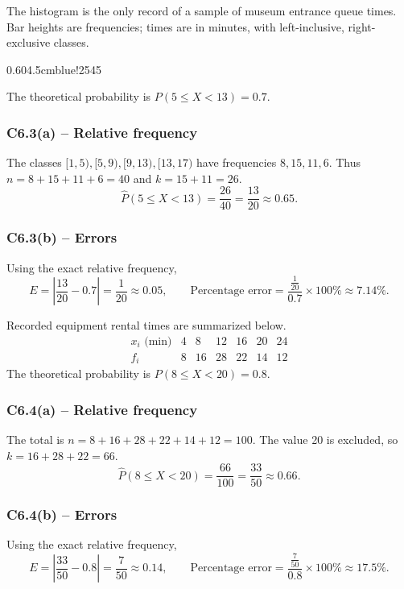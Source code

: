 {
The histogram is the only record of a sample of museum entrance queue times.
Bar heights are frequencies; times are in minutes, with left-inclusive,
right-exclusive classes.
\begin{center}
{0.60\textwidth}{4.5cm}{blue!25}{4}{5}
\end{center}
The theoretical probability is $P(5\le X<13)=0.7$.
\label{sol:c6-3a}
\subsubsection*{C6.3(a) -- Relative frequency }
The classes $[1,5),[5,9),[9,13),[13,17)$ have frequencies
$8,15,11,6$. Thus $n=8+15+11+6=40$ and $k=15+11=26$.
\[
\widehat P(5\le X<13)=\frac{26}{40}=\frac{13}{20}\approx0.65.
\]
\label{sol:c6-3b}
\subsubsection*{C6.3(b) -- Errors }
Using the exact relative frequency,
\[
E=\left|\frac{13}{20}-0.7\right|=\frac{1}{20}\approx0.05,\qquad
\text{Percentage error}=\frac{\frac{1}{20}}{0.7}\times100\%\approx7.14\%.
\]
\secInicio[sec:c6-3]

}

{
Recorded equipment rental times are summarized below.
\[
\begin{array}{c|rrrrrr}
x_i\text{ (min)}&4&8&12&16&20&24\\\hline
f_i&8&16&28&22&14&12
\end{array}
\]
The theoretical probability is $P(8\le X<20)=0.8$.
\label{sol:c6-4a}
\subsubsection*{C6.4(a) -- Relative frequency }
The total is $n=8+16+28+22+14+12=100$.
The value 20 is excluded, so $k=16+28+22=66$.
\[
\widehat P(8\le X<20)=\frac{66}{100}=\frac{33}{50}\approx0.66.
\]
\label{sol:c6-4b}
\subsubsection*{C6.4(b) -- Errors }
Using the exact relative frequency,
\[
E=\left|\frac{33}{50}-0.8\right|=\frac{7}{50}\approx0.14,\qquad
\text{Percentage error}=\frac{\frac{7}{50}}{0.8}\times100\%\approx17.5\%.
\]
\secInicio[sec:c6-4]

}


